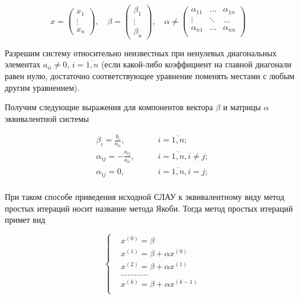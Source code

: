 $$x = \begin{pmatrix}
    x_1 \\
    \vdots \\
    x_n
\end{pmatrix},\quad
\beta = \begin{pmatrix}
    \beta_1 \\
    \vdots \\
    \beta_n
\end{pmatrix},\quad
\alpha \neq \begin{pmatrix}
    \alpha_{11} & \hdots & \alpha_{1n} \\
    \vdots & \ddots & \hdots \\
    \alpha_{n1} & \hdots & \alpha_{nn} \\
\end{pmatrix}\quad$$

Разрешим систему относительно неизвестных при ненулевых диагональных элементах
$a_{ii} \neq 0$, $i = \overline{1, n}$ 
(если какой-либо коэффициент на главной диагонали равен нулю, достаточно
соответствующее уравнение поменять местами с любым другим уравнением).

Получим
следующие выражения для компонентов вектора $\beta$ и матрицы $\alpha$  эквивалентной системы

$$\begin{aligned}
    \beta_i = \frac{b_i}{a_{ii}}, &\qquad i = \overline{1,n}; \\
    \alpha_{ij} = -\frac{a_{ij}}{a_{ii}}, &\qquad i = \overline{1,n}, i \neq j; \\
    \alpha_{ij} = 0, &\qquad i = \overline{1,n}, i = j; \\
\end{aligned}$$

При таком способе приведения исходной СЛАУ к эквивалентному виду метод простых
итераций носит название метода Якоби. Тогда метод простых итераций примет вид

$$\left\{\begin{aligned}
    &x^{(0)} = \beta \\
    &x^{(1)} = \beta + \alpha x^{(0)} \\
    &x^{(2)} = \beta + \alpha x^{(1)} \\
    &\dots\dots\dots\dots \\
    &x^{(k)} = \beta + \alpha x^{(k - 1)} \\
\end{aligned}\right.$$

